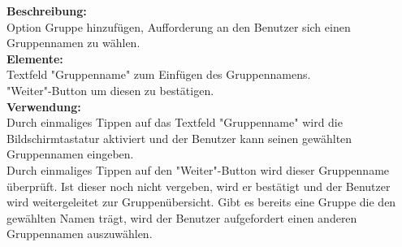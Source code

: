 \textbf{Beschreibung:}\\
Option Gruppe hinzufügen, Aufforderung an den Benutzer sich einen Gruppennamen zu wählen.\\
\textbf{Elemente:}\\
Textfeld "Gruppenname" zum Einfügen des Gruppennamens.\\
"Weiter"-Button um diesen zu bestätigen.\\
\textbf{Verwendung:}\\
Durch einmaliges Tippen auf das Textfeld "Gruppenname" wird die Bildschirmtastatur aktiviert und der Benutzer kann seinen gewählten Gruppennamen eingeben.\\
Durch einmaliges Tippen auf den "Weiter"-Button wird dieser Gruppenname überprüft. Ist dieser noch nicht vergeben, wird er bestätigt und der Benutzer wird weitergeleitet zur Gruppenübersicht. Gibt es bereits eine Gruppe die den gewählten Namen trägt, wird der Benutzer aufgefordert einen anderen Gruppennamen auszuwählen.
\newpage

